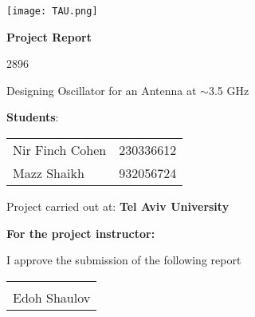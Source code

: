 \documentclass[]{extarticle}
\begin{document}
\begin{titlepage}
    \centering
    \texttt{[image: TAU.png]}\par\vspace{1cm}
    {\LARGE\bfseries Project Report\par}
    \vspace{1cm}
    {\Large 2896\par}
    \vspace{0.5cm}
    {\Large Designing Oscillator for an Antenna at $\sim$3.5 GHz\par}
    \vspace{1cm}
    
    \Large \textbf{Students}:\par
    \vspace{0.5cm}
    \begin{tabular}{l l}
        Nir Finch Cohen & 230336612 \\
        Mazz Shaikh & 932056724 \\
    \end{tabular}\par
    \vspace{1cm}
    
    \Large Project carried out at: \textbf{Tel Aviv University}\par
    \vspace{1cm}
    
    \Large \textbf{For the project instructor:}\par
    \vspace{0.3cm}
    
    I approve the submission of the following report\par
    \vspace{1cm}
    
    \begin{flushright}
        \begin{tabular}{l}
            \\
            \\
            Edoh Shaulov \\
        \end{tabular}
    \end{flushright}
\end{titlepage}


\tableofcontents


\newpage







\begin{comment}
pdflatex yourfile.tex
bibtex yourfile.aux
pdflatex yourfile.tex
pdflatex yourfile.tex
\end{comment}


\newpage


\end{document}
